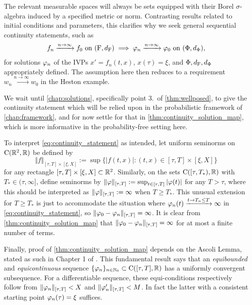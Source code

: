 The relevant measurable spaces will always be sets equipped with their Borel $\sigma$-algebra induced by a specified metric or norm. Contrasting results related to initial conditions and parameters, this clarifies why we seek general sequential continuity statements, such as
\begin{equation}\label{eq:cont_summary}
    f_n\xrightarrow{n\to\infty}f_0 \text{ on } (\mathrm{F},d_{\mathrm{F}}) \implies \varphi_n\xrightarrow{n\to\infty}\varphi_0 \text{ on } (\Phi,d_{\Phi}),
\end{equation}
for solutions $\varphi_n$ of the IVPs $x'=f_n(t,x)$, $x(\tau)=\xi$, and $\Phi,d_{\mathrm{F}},d_\Phi$ appropriately defined. The assumption here then reduces to a requirement $w_n\xrightarrow{n\to\infty}w_0$ in the Heston example.

We wait until \autoref{chap:solutions}, specifically point 3.~of \autoref{thm:wellposed}, to give the continuity statement which will be relied upon in the probabilistic framework of \autoref{chap:framework}, and for now settle for that in \autoref{thm:continuity_solution_map}, which is more informative in the probability-free setting here.

To interpret \autoref{eq:continuity_statement} as intended, let uniform seminorms on $\mathrm{C}(\mathbb{R}^2,\mathbb{R})$ be defined by
\begin{equation}
    \Vert f \Vert_{[\tau,T]\times[\xi,X]}:=\sup\{|f(t,x)|:(t,x)\in[\tau,T]\times[\xi,X]\}
\end{equation}
for any rectangle $[\tau,T]\times[\xi,X]\subset\mathbb{R}^2$. Similarly, on the sets $\mathrm{C}([\tau,T_*),\mathbb{R})$ with $T_*\in(\tau,\infty]$, define seminorms by $\Vert\varphi\Vert_{[\tau,T]}:=\sup_{t\in[\tau,T]}|\varphi(t)|$ for any $T>\tau$, where this should be interpreted as $\Vert\varphi\Vert_{[\tau,T]}:=\infty$ when $T\ge T_*$. This unusual extension for $T\ge T_*$ is just to accommodate the situation where $\varphi_n(t)\xrightarrow{t\to T_n\le T}\infty$ in \autoref{eq:continuity_statement}, so $\Vert \varphi_0 - \varphi_n \Vert_{[\tau,T]}=\infty$. It is clear from \autoref{thm:continuity_solution_map} that $\Vert \varphi_0 - \varphi_n \Vert_{[\tau,T]}=\infty$ for at most a finite number of terms.

Finally, proof of \autoref{thm:continuity_solution_map} depends on the Ascoli Lemma, stated as such in Chapter 1 of \cite{coddington_1955}. This fundamental result says that an \emph{equibounded} and \emph{equicontinuous} sequence $\{\varphi_n\}_{n\in\mathbb{N}_0}\subset\mathrm{C}([\tau,T],\mathbb{R})$ has a uniformly convergent subsequence. For a differentiable sequence, these equi-conditions respectively follow from $\Vert \varphi_n\Vert_{[\tau,T]}< X$ and $\Vert \varphi'_n\Vert_{[\tau,T]}< M$. In fact the latter with a consistent starting point $\varphi_n(\tau)=\xi$ suffices.


